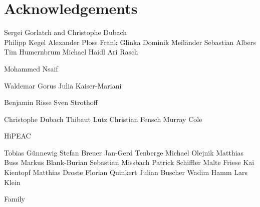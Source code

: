 

\begingroup

\let\clearpage\relax
\let\cleardoublepage\relax
\let\cleardoublepage\relax

\chapter*{Acknowledgements} %

Sergei Gorlatch and Christophe Dubach\\

Philipp Kegel
Alexander Ploss
Frank Glinka
Dominik Meil{\"a}nder
Sebastian Albers
Tim Humernbrum
Michael Haidl
Ari Rasch

Mohammed Nsaif

Waldemar Gorus
Julia Kaiser-Mariani

Benjamin Risse
Sven Strothoff

Christophe Dubach
Thibaut Lutz
Christian Fensch
Murray Cole

HiPEAC

Tobias G{\"u}nnewig
Stefan Breuer
Jan-Gerd Tenberge
Michael Olejnik
Matthias Buss
Markus Blank-Burian
Sebastian Missbach
Patrick Schiffler
Malte Friese
Kai Kientopf
Matthias Droste
Florian Quinkert
Julian Buscher
Wadim Hamm
Lars Klein

Family


\endgroup
